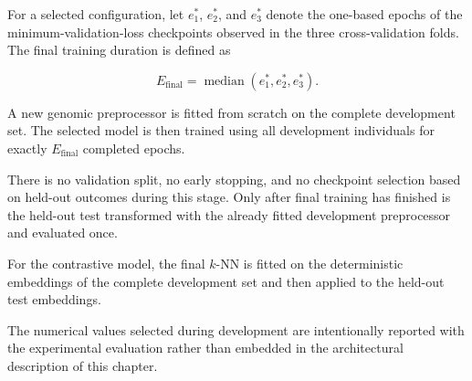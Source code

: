 For a selected configuration, let $e_1^{*}$, $e_2^{*}$, and
$e_3^{*}$ denote the one-based epochs of the minimum-validation-loss
checkpoints observed in the three cross-validation folds. The final
training duration is defined as

\begin{equation}
    E_{\mathrm{final}}
    =
    \operatorname{median}
    \left(
        e_1^{*},
        e_2^{*},
        e_3^{*}
    \right).
    \label{eq:final_epoch_budget}
\end{equation}

A new genomic preprocessor is fitted from scratch on the complete
development set. The selected model is then trained using all
development individuals for exactly $E_{\mathrm{final}}$ completed
epochs.

There is no validation split, no early stopping, and no checkpoint
selection based on held-out outcomes during this stage. Only after
final training has finished is the held-out test transformed with the
already fitted development preprocessor and evaluated once.

For the contrastive model, the final $k$-NN is fitted on the
deterministic embeddings of the complete development set and then
applied to the held-out test embeddings.

The numerical values selected during development are intentionally
reported with the experimental evaluation rather than embedded in the
architectural description of this chapter.
